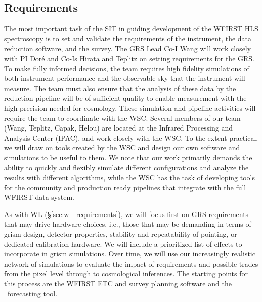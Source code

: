 
\subsection{Requirements}
\label{sec:grs_requirements}

The most important task of the SIT in guiding
development of the WFIRST HLS spectroscopy is to set and validate the
requirements of the instrument, the data reduction software, and the survey.
The GRS Lead Co-I Wang will work closely with PI Dor\'e and Co-Is
Hirata and Teplitz on setting requirements for the GRS. To make fully
informed decisions, the team requires high fidelity simulations of
both
instrument performance and the observable sky that the instrument will
measure.  The team must also ensure that the analysis of these data by
the reduction pipeline will be of sufficient quality to enable
measurement with the high precision needed for cosmology.
These simulation and pipeline activities will require the team to
coordinate with the WSC.  Several members of our team (Wang, Teplitz,
Capak, Helou) are located at the Infrared Processing and Analysis
Center (IPAC), and work closely with the WSC.
To the extent practical, we will draw on tools created by the WSC and
design our own software and simulations to be useful to them.
We note that our work primarily demands the ability to quickly and flexibly
simulate different configurations and analyze the results with different
algorithms, while the WSC has the task of developing tools for the
community and production
ready pipelines that integrate with the full WFIRST data system.

 As with WL (\S\ref{sec:wl_requirements}), we will focus first on GRS
requirements that may drive hardware choices, i.e., those that may be
demanding in terms of grism design, detector properties, stability and repeatability of pointing, or dedicated calibration hardware.
We will include a prioritized list of effects to
incorporate in grism simulations.  Over time, we will use our
increasingly realistic network of simulations to evaluate the impact
of requirements and possible trades from the pixel level through
to cosmological inferences. The starting points for this
process are the WFIRST ETC and survey planning software
and the \CoLi\ forecasting tool.

